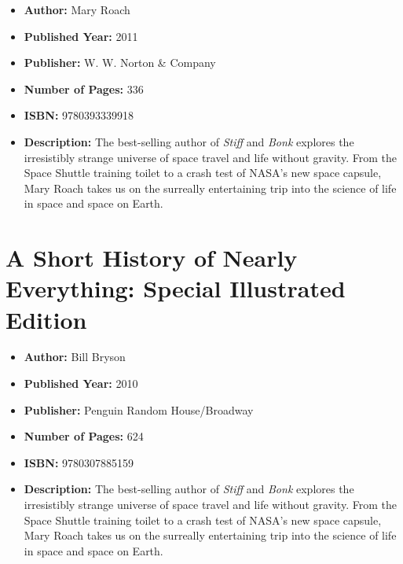 \documentclass{tufte-handout}
\begin{document}
\begin{itemize}
    \item[] \textbf{Author:} Mary Roach
    \item[] \textbf{Published Year:} 2011
    \item[] \textbf{Publisher:} W. W. Norton \& Company
    \item[] \textbf{Number of Pages:} 336     
    \item[] \textbf{ISBN:} 9780393339918
    \item[] \textbf{Description:} The best-selling author of \textit{Stiff} and \textit{Bonk} explores the irresistibly strange universe of space travel and life without gravity. From the Space Shuttle training toilet to a crash test of NASA’s new space capsule, Mary Roach takes us on the surreally entertaining trip into the science of life in space and space on Earth.
\end{itemize}

\section*{A Short History of Nearly Everything: Special Illustrated Edition}

\begin{itemize}
    \item[] \textbf{Author:} Bill Bryson
    \item[] \textbf{Published Year:} 2010
    \item[] \textbf{Publisher:} Penguin Random House/Broadway
    \item[] \textbf{Number of Pages:} 624     
    \item[] \textbf{ISBN:} 9780307885159
    \item[] \textbf{Description:} The best-selling author of \textit{Stiff} and \textit{Bonk} explores the irresistibly strange universe of space travel and life without gravity. From the Space Shuttle training toilet to a crash test of NASA’s new space capsule, Mary Roach takes us on the surreally entertaining trip into the science of life in space and space on Earth.
\end{itemize}
\end{document}
